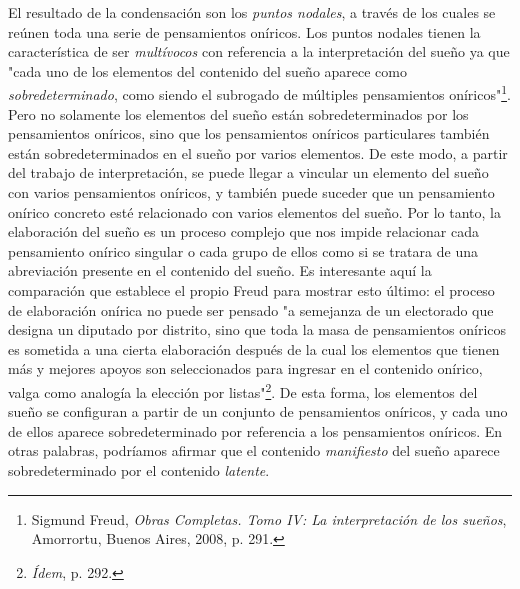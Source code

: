 \documentclass{book}
\begin{document}
El resultado de la condensación son los \emph{puntos nodales}, a través
de los cuales se reúnen toda una serie de pensamientos oníricos. Los
puntos nodales tienen la característica de ser \emph{multívocos} con
referencia a la interpretación del sueño ya que "cada uno de los
elementos del contenido del sueño aparece como \emph{sobredeterminado},
como siendo el subrogado de múltiples pensamientos oníricos"\footnote{Sigmund
  Freud, \emph{Obras Completas. Tomo IV: La interpretación de los
  sueños}, Amorrortu, Buenos Aires, 2008, p. 291.}. Pero no solamente
los elementos del sueño están sobredeterminados por los pensamientos
oníricos, sino que los pensamientos oníricos particulares también están
sobredeterminados en el sueño por varios elementos. De este modo, a
partir del trabajo de interpretación, se puede llegar a vincular un
elemento del sueño con varios pensamientos oníricos, y también puede
suceder que un pensamiento onírico concreto esté relacionado con varios
elementos del sueño. Por lo tanto, la elaboración del sueño es un
proceso complejo que nos impide relacionar cada pensamiento onírico
singular o cada grupo de ellos como si se tratara de una abreviación
presente en el contenido del sueño. Es interesante aquí la comparación
que establece el propio Freud para mostrar esto último: el proceso de
elaboración onírica no puede ser pensado "a semejanza de un electorado
que designa un diputado por distrito, sino que toda la masa de
pensamientos oníricos es sometida a una cierta elaboración después de la
cual los elementos que tienen más y mejores apoyos son seleccionados
para ingresar en el contenido onírico, valga como analogía la elección
por listas"\footnote{\emph{Ídem}, p. 292.}. De esta forma, los elementos
del sueño se configuran a partir de un conjunto de pensamientos
oníricos, y cada uno de ellos aparece sobredeterminado por referencia a
los pensamientos oníricos. En otras palabras, podríamos afirmar que el
contenido \emph{manifiesto} del sueño aparece sobredeterminado por el
contenido \emph{latente}.
\end{document}
